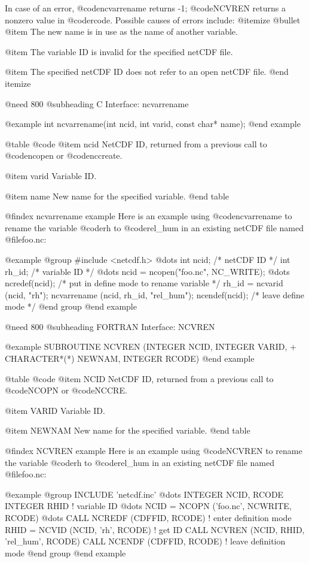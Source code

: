 In case of an error, @code{ncvarrename} returns -1; @code{NCVREN} returns a
nonzero value in @code{rcode}.  Possible causes of errors include:
@itemize @bullet
@item
The new name is in use as the name of another variable.

@item
The variable ID is invalid for the specified netCDF file.

@item
The specified netCDF ID does not refer to an open netCDF file.
@end itemize

@need 800
@subheading C Interface:  ncvarrename

@example
int ncvarrename(int ncid, int varid, const char* name);
@end example

@table @code
@item ncid
NetCDF ID, returned from a previous call to @code{ncopen} or @code{nccreate}.

@item varid
Variable ID.

@item name
New name for the specified variable.
@end table

@findex ncvarrename example
Here is an example using @code{ncvarrename} to rename the variable
@code{rh} to @code{rel_hum} in an existing netCDF file named @file{foo.nc}:

@example
@group
#include <netcdf.h>
   @dots{}
int  ncid;                         /* netCDF ID */
int  rh_id;                        /* variable ID */
   @dots{}
ncid = ncopen("foo.nc", NC_WRITE);
   @dots{}
ncredef(ncid);  /* put in define mode to rename variable */
rh_id = ncvarid (ncid, "rh");
ncvarrename (ncid, rh_id, "rel_hum");
ncendef(ncid);  /* leave define mode */
@end group
@end example

@need 800
@subheading FORTRAN Interface:  NCVREN

@example
      SUBROUTINE NCVREN (INTEGER NCID, INTEGER VARID,
     +                   CHARACTER*(*) NEWNAM, INTEGER RCODE)
@end example

@table @code
@item NCID
NetCDF ID, returned from a previous call to @code{NCOPN} or @code{NCCRE}.

@item VARID
Variable ID.

@item NEWNAM
New name for the specified variable.
@end table

@findex NCVREN example
Here is an example using @code{NCVREN} to rename the variable @code{rh}
to @code{rel_hum} in an existing netCDF file named @file{foo.nc}:

@example
@group
      INCLUDE 'netcdf.inc'
         @dots{}
      INTEGER  NCID, RCODE
      INTEGER  RHID               ! variable ID
         @dots{}
      NCID = NCOPN ('foo.nc', NCWRITE, RCODE)
         @dots{}
      CALL NCREDF (CDFFID, RCODE)  ! enter definition mode
      RHID = NCVID (NCID, 'rh', RCODE)  ! get ID
      CALL NCVREN (NCID, RHID, 'rel_hum', RCODE)
      CALL NCENDF (CDFFID, RCODE)  ! leave definition mode
@end group
@end example

